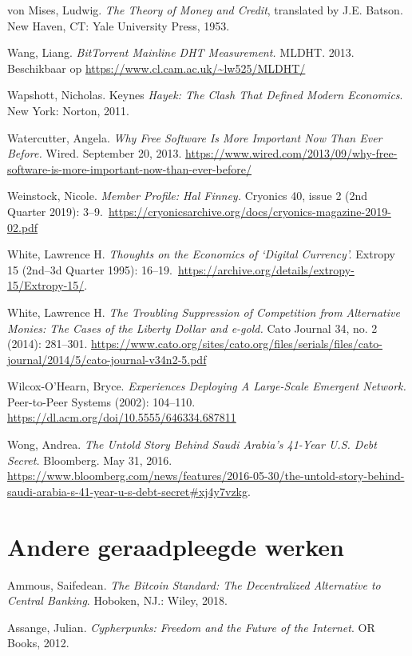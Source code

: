 \documentclass[
  a5paper,
  smalldemyvopaper,11pt,twoside,onecolumn,openright,extrafontsizes,
hidelinks]{memoir}
\begin{document}
{von Mises, Ludwig. \emph{The Theory of Money and Credit}, translated by
J.E. Batson. New Haven, CT: Yale University Press, 1953.

Wang, Liang. \emph{BitTorrent Mainline DHT Measurement.} MLDHT. 2013.
Beschikbaar op \url{https://www.cl.cam.ac.uk/~lw525/MLDHT/}

Wapshott, Nicholas. Keynes \emph{Hayek: The Clash That Defined Modern
Economics}. New York: Norton, 2011.

Watercutter, Angela. \emph{Why Free Software Is More Important Now Than
Ever Before.} Wired. September 20, 2013.
\url{https://www.wired.com/2013/09/why-free-software-is-more-important-now-than-ever-before/}

Weinstock, Nicole. \emph{Member Profile: Hal Finney.} Cryonics 40, issue
2 (2nd Quarter 2019):
3--9.~\url{https://cryonicsarchive.org/docs/cryonics-magazine-2019-02.pdf}

White, Lawrence H. \emph{Thoughts on the Economics of `Digital
Currency'.} Extropy 15 (2nd--3d Quarter 1995):
16--19.~\url{https://archive.org/details/extropy-15/Extropy-15/}.

White, Lawrence H. \emph{The Troubling Suppression of Competition from
Alternative Monies: The Cases of the Liberty Dollar and e-gold.} Cato
Journal 34, no. 2 (2014): 281--301.
\url{https://www.cato.org/sites/cato.org/files/serials/files/cato-journal/2014/5/cato-journal-v34n2-5.pdf}

Wilcox-O'Hearn, Bryce. \emph{Experiences Deploying A Large-Scale
Emergent Network.} Peer-to-Peer Systems (2002): 104--110.
\url{https://dl.acm.org/doi/10.5555/646334.687811}

Wong, Andrea. \emph{The Untold Story Behind Saudi Arabia's 41-Year U.S.
Debt Secret.} Bloomberg. May 31, 2016.
\url{https://www.bloomberg.com/news/features/2016-05-30/the-untold-story-behind-saudi-arabia-s-41-year-u-s-debt-secret\#xj4y7vzkg}.

\section*{Andere geraadpleegde
werken}\label{andere-geraadpleegde-werken}


Ammous, Saifedean. \emph{The Bitcoin Standard: The Decentralized
Alternative to Central Banking}. Hoboken, NJ.: Wiley, 2018.

Assange, Julian. \emph{Cypherpunks: Freedom and the Future of the
Internet}. OR Books, 2012.

}
\end{document}
